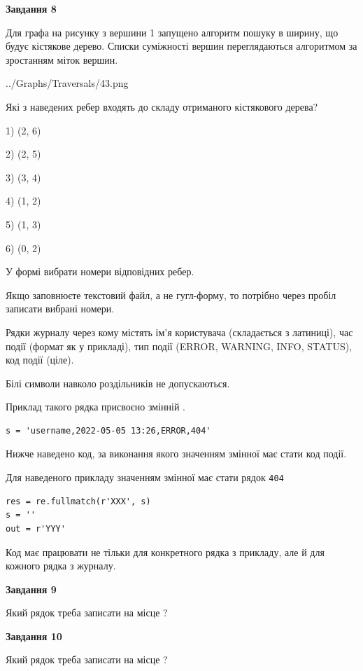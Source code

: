 \documentclass[12pt, ukrainian]{article}
\def\code#1{\Verb!#1!}
\begin{document}
{\begin {large}
{\begin {center}\textbf{Завдання 8}\end {center}}\par
Для графа на рисунку з вершини 1 запущено алгоритм пошуку в ширину, що будує кістякове дерево. Списки суміжності вершин переглядаються алгоритмом за зростанням міток вершин.\par
\begin{center}
	{../Graphs/Traversals/43.png}
\end{center}
\par Які з наведених ребер входять до складу отриманого кістякового дерева?\par
1) (2, 6)\par
2) (2, 5)\par
3) (3, 4)\par
4) (1, 2)\par
5) (1, 3)\par
6) (0, 2)\par
{\vskip 15pt} У формі вибрати номери відповідних ребер.


Якщо заповнюєте текстовий файл, а не гугл-форму, то потрібно через пробіл записа\-ти вибрані номери.\par
\newpage


Рядки журналу через кому містять ім'я користувача (складається з латиниці), час події (фор\-мат як у прикладі), тип події (ERROR, WARNING, INFO, STATUS), код події (ціле).

Білі символи навколо роздільників не допускаються.

Приклад такого рядка присвоєно змінній .



\begin{verbatim}
s = 'username,2022-05-05 13:26,ERROR,404'
\end{verbatim}


Нижче наведено код, за виконання якого значенням змінної  має стати код події.

Для наведеного прикладу значенням змінної  має стати рядок \code{404}



\begin{verbatim}
res = re.fullmatch(r'XXX', s)
s = ''
out = r'YYY'
\end{verbatim}


Код має працювати не тільки для конкретного рядка з прикладу, але й для кожного рядка з журналу.

{\begin {center}\textbf{Завдання 9}\end {center}}\par
Який рядок треба записати на місце  ?\par
\vspace{5mm}


{\begin {center}\textbf{Завдання 10}\end {center}}\par
Який рядок треба записати на місце  ?\par


\newpage


\end {large}}
\end{document}
